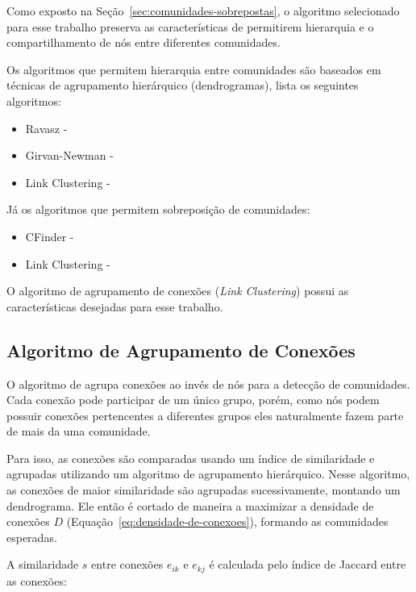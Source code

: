 \documentclass[
  article,
  11pt,
  a4paper,
  english,
  brazil,
  sumario=tradicional]{abntex2}
\begin{document}
Como exposto na Seção~\ref{sec:comunidades-sobrepostas}, o algoritmo selecionado para esse trabalho preserva as características de permitirem hierarquia e o compartilhamento de nós entre diferentes comunidades.

Os algoritmos que permitem hierarquia entre comunidades são baseados em técnicas de agrupamento hierárquico (dendrogramas),  lista os seguintes algoritmos:

\begin{itemize}
  \item Ravasz - 
  \item Girvan-Newman - 
  \item Link Clustering - 
\end{itemize}

Já os algoritmos que permitem sobreposição de comunidades:

\begin{itemize}
  \item CFinder - 
  \item Link Clustering - 
\end{itemize}

O algoritmo de agrupamento de conexões (\textit{Link Clustering}) possui as características desejadas para esse trabalho.

\subsection{Algoritmo de Agrupamento de Conexões}

O algoritmo de  agrupa conexões ao invés de nós para a detecção de comunidades. Cada conexão pode participar de um único grupo, porém, como nós podem possuir conexões pertencentes a diferentes grupos eles naturalmente fazem parte de mais da uma comunidade.

Para isso, as conexões são comparadas usando um índice de similaridade e agrupadas utilizando um algoritmo de agrupamento hierárquico. Nesse algoritmo, as conexões de maior similaridade são agrupadas sucessivamente, montando um dendrograma. Ele então é cortado de maneira a maximizar a densidade de conexões $D$ (Equação~\ref{eq:densidade-de-conexoes}), formando as comunidades esperadas.

A similaridade $s$ entre conexões $e_{ik}$ e $e_{kj}$ é calculada pelo índice de Jaccard entre as conexões:
\end{document}
